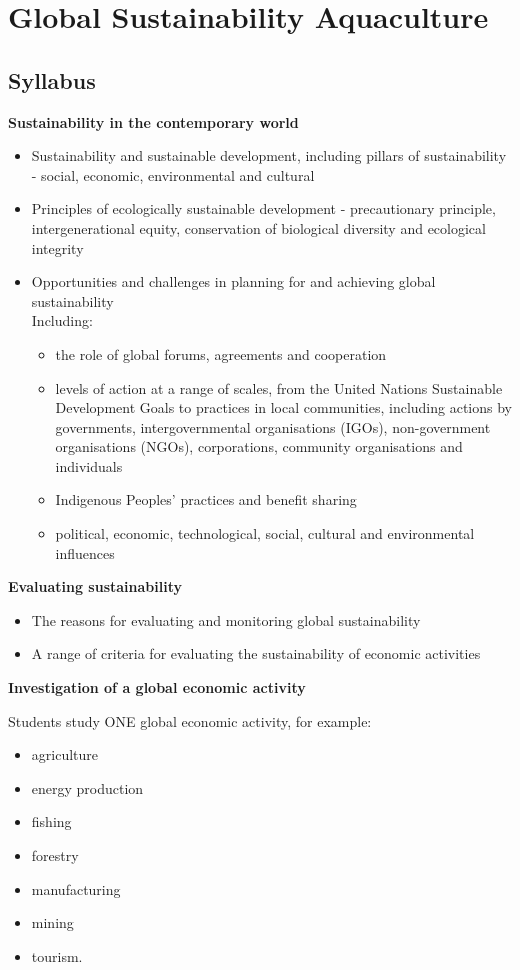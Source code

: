 
\chapter{Global Sustainability \; Aquaculture}

\section{Syllabus}
	\textbf{Sustainability in the contemporary world}
	\begin{itemize}
		\item Sustainability and sustainable development, including pillars of sustainability - social, economic, environmental and cultural
		\item Principles of ecologically sustainable development - precautionary principle, intergenerational equity, conservation of biological diversity and ecological integrity
		\item Opportunities and challenges in planning for and achieving global sustainability \\ Including:
		\begin{itemize}
			\item the role of global forums, agreements and cooperation
			\item levels of action at a range of scales, from the United Nations Sustainable Development Goals to practices in local communities, including actions by governments, intergovernmental organisations (IGOs), non-government organisations (NGOs), corporations, community organisations and individuals
			\item Indigenous Peoples' practices and benefit sharing 
			\item political, economic, technological, social, cultural and environmental influences
		\end{itemize}
	\end{itemize}

	\textbf{Evaluating sustainability}
	\begin{itemize}
		\item The reasons for evaluating and monitoring global sustainability
		\item A range of criteria for evaluating the sustainability of economic activities
	\end{itemize}
	
	\textbf{Investigation of a global economic activity}

	Students study ONE global economic activity, for example:
	\begin{itemize}
		\item agriculture
		\item energy production
		\item fishing
		\item forestry
		\item manufacturing
		\item mining
		\item tourism.
	\end{itemize}

